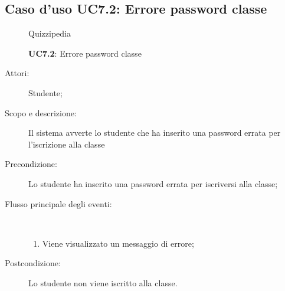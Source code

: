 \subsection{Caso d'uso UC7.2: Errore password classe}
	\begin{figure}[H]
		\centering
		\begin{resizedtikzpicture}{\textwidth}
		\begin{umlsystem}[x=0, fill=lightgray!20]{Quizzipedia}
		\end{umlsystem}
		\end{resizedtikzpicture}
		\caption{\textbf{UC7.2}: Errore password classe}
		\label{UC7.2}
	\end{figure}
\begin{description}
\item[Attori:] Studente;
\item[Scopo e descrizione:] Il sistema avverte lo studente che ha inserito una password errata per l'iscrizione alla classe
      \item[Precondizione:] Lo studente ha inserito una password errata per iscriversi alla classe;

        \item[Flusso principale degli eventi:] \ 
 \begin{enumerate}
          \item Viene visualizzato un messaggio di errore;

      \end{enumerate}
    \item[Postcondizione:] Lo studente non viene iscritto alla classe.
  \end{description}
\hypertarget{UC8}{}
